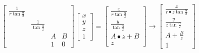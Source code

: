 \documentclass[12pt]{article}
\begin{document}
    \[
        \left[ \begin{array}{cccc}
            \frac{1}{r\tan{\frac{\alpha}{2}}} & & & \\
            & \frac{1}{\tan{\frac{\alpha}{2}}} & & \\
            & & A & B \\
            & & 1 & 0
        \end{array} \right]
        \left[ \begin{array}{c}
            x \\
            y \\
            z \\
            1
        \end{array} \right]
        =
        \left[ \begin{array}{c}
            \frac{x}{r\tan{\frac{\alpha}{2}}} \\
            \frac{y}{\tan{\frac{\alpha}{2}}} \\
            A\bullet z+B \\
            z
        \end{array} \right]
        \to
        \left[ \begin{array}{c}
            \frac{x}{r\bullet z\tan{\frac{\alpha}{2}}} \\
            \frac{y}{z\tan{\frac{\alpha}{2}}} \\
            A+\frac{B}{z} \\
            1
        \end{array} \right]
    \]
\end{document}

